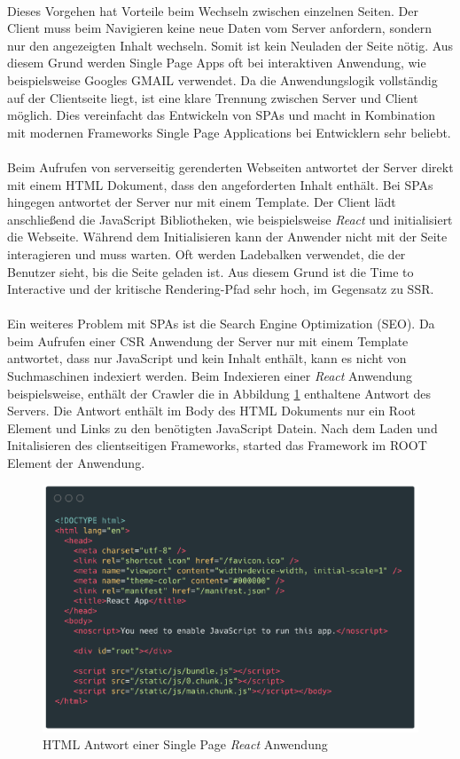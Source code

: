 \documentclass[runningheads]{llncs}
\numberwithin{figure}{section}
\begin{document}
\\
Dieses Vorgehen hat Vorteile beim Wechseln zwischen einzelnen Seiten. 
Der Client muss beim Navigieren keine neue Daten vom Server anfordern, 
sondern nur den angezeigten Inhalt wechseln. 
Somit ist kein Neuladen der Seite nötig. 
Aus diesem Grund werden Single Page Apps oft bei interaktiven Anwendung, 
wie beispielsweise Googles GMAIL verwendet. 
Da die Anwendungslogik vollständig auf der Clientseite liegt, 
ist eine klare Trennung zwischen Server und Client möglich. 
Dies vereinfacht das Entwickeln von SPAs und
macht in Kombination mit modernen Frameworks 
Single Page Applications bei Entwicklern sehr beliebt.
\\
\\
Beim Aufrufen von serverseitig gerenderten Webseiten antwortet
der Server direkt mit einem HTML Dokument, 
dass den angeforderten Inhalt enthält. 
Bei SPAs hingegen antwortet der Server nur mit einem Template. 
Der Client lädt anschließend die JavaScript Bibliotheken, 
wie beispielsweise \textit{React} und initialisiert die Webseite. 
Während dem Initialisieren kann der Anwender nicht mit der Seite interagieren
und muss warten. Oft werden Ladebalken verwendet, 
die der Benutzer sieht, bis die Seite geladen ist. 
Aus diesem Grund ist die Time to Interactive und 
der kritische Rendering-Pfad sehr hoch, im Gegensatz zu SSR. 
\\
\\
Ein weiteres Problem mit SPAs ist die Search Engine Optimization (SEO). 
Da beim Aufrufen einer CSR Anwendung der Server nur mit einem Template 
antwortet, dass nur JavaScript und kein Inhalt enthält, 
kann es nicht von Suchmaschinen indexiert werden. 
Beim Indexieren einer \textit{React} Anwendung beispielsweise, 
enthält der Crawler die in Abbildung \ref{HTML Antwort einer Single Page React Anwendung} enthaltene Antwort des Servers. 
Die Antwort enthält im Body des HTML Dokuments nur ein Root Element und Links zu
den benötigten JavaScript Datein. Nach dem Laden und Initalisieren des clientseitigen Frameworks,
started das Framework im ROOT Element der Anwendung.
\begin{figure}[h]
  \centering
  \includegraphics[width=12cm]{images/react-code-small}
  \caption{HTML Antwort einer Single Page \textit{React} Anwendung}
  \label{HTML Antwort einer Single Page React Anwendung}
\end{figure}
\end{document}

